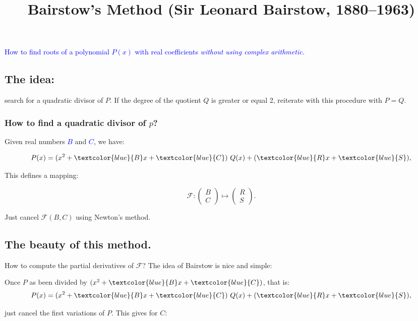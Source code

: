 \documentclass[11pt]{amsart}
\title{Bairstow's Method (Sir Leonard Bairstow,
    1880--1963)}
\begin{document}
\maketitle


  \begin{center}
    \textcolor{blue}{\large How to find roots of a polynomial  $P(x)$
      with real coefficients 
        \emph{without using complex arithmetic.}}
  \end{center}
   \subsection*{The idea:}    

  search for a quadratic divisor of $P$. If the degree of the quotient $Q$
  is greater or equal 2, reiterate with this procedure with $P=Q$.

  \subsubsection*{How to find a quadratic divisor of $p$?} 
 

  Given real numbers \textcolor{blue}{$B$} and \textcolor{blue}{$C$},
  we have:

  $$P(x)= (x^2+\textcolor{blue}{B}x+\textcolor{blue}{C})\ Q(x)+ (\textcolor{blue}{R}x+\textcolor{blue}{S}),$$

  This defines a mapping:
  
$$\mathcal{F}: \begin{pmatrix}B \\ C  \end{pmatrix}
\mapsto  \begin{pmatrix}R\\S\end{pmatrix}.$$

  Just cancel $\mathcal{F}(B,C)$ using Newton's method.

  \subsection*{The beauty of this method.}
  
How to compute the partial derivatives of  $\mathcal{F}$? The idea of
Bairstow is  nice and simple:

Once $P$ as been divided by
$(x^2+\textcolor{blue}{B}x+\textcolor{blue}{C})$, that is:
$$P(x)= (x^2+\textcolor{blue}{B}x+\textcolor{blue}{C})\ Q(x)+ (\textcolor{blue}{R}x+\textcolor{blue}{S}),$$

just cancel the first variations of $P$. This gives for $C$:
\end{document}
